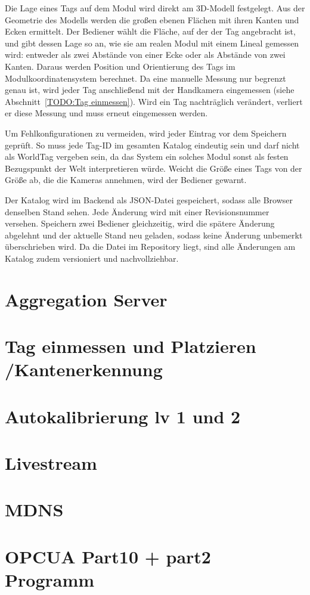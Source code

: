 Die Lage eines Tags auf dem Modul wird direkt am 3D-Modell festgelegt. Aus der Geometrie des Modells werden die großen ebenen Flächen mit ihren Kanten und Ecken ermittelt. Der Bediener wählt die Fläche, auf der der Tag angebracht ist, und gibt dessen Lage so an, wie sie am realen Modul mit einem Lineal gemessen wird: entweder als zwei Abstände von einer Ecke oder als Abstände von zwei Kanten. Daraus werden Position und Orientierung des Tags im Modulkoordinatensystem berechnet. Da eine manuelle Messung nur begrenzt genau ist, wird jeder Tag anschließend mit der Handkamera eingemessen (siehe Abschnitt~\ref{TODO:Tag einmessen}). Wird ein Tag nachträglich verändert, verliert er diese Messung und muss erneut eingemessen werden.

Um Fehlkonfigurationen zu vermeiden, wird jeder Eintrag vor dem Speichern geprüft. So muss jede Tag-ID im gesamten Katalog eindeutig sein und darf nicht als WorldTag vergeben sein, da das System ein solches Modul sonst als festen Bezugspunkt der Welt interpretieren würde. Weicht die Größe eines Tags von der Größe ab, die die Kameras annehmen, wird der Bediener gewarnt.

Der Katalog wird im Backend als JSON-Datei gespeichert, sodass alle Browser denselben Stand sehen. Jede Änderung wird mit einer Revisionsnummer versehen. Speichern zwei Bediener gleichzeitig, wird die spätere Änderung abgelehnt und der aktuelle Stand neu geladen, sodass keine Änderung unbemerkt überschrieben wird. Da die Datei im Repository liegt, sind alle Änderungen am Katalog zudem versioniert und nachvollziehbar.
\section{Aggregation Server}
\section{Tag einmessen und Platzieren /Kantenerkennung}
\section{Autokalibrierung lv 1 und 2}
\section{Livestream}
\section{MDNS}
\section{OPCUA Part10 + part2 Programm}
